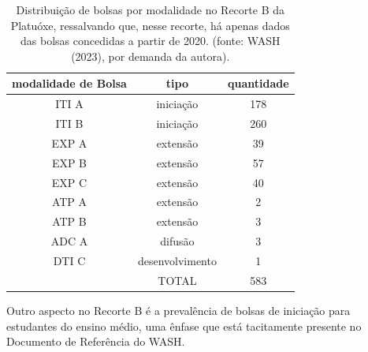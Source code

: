 \noindent\begin{flushright}\mbox{\linespread{1}\selectfont\centering{}}\end{flushright}






\begin{table}[htb]
\tiny
\caption{\label{8869e5a84c342de33f5dd045c633ba43f41c955f}Distribuição de bolsas por modalidade no Recorte B da Platuóxe, ressalvando que, nesse recorte, há apenas dados das bolsas concedidas a partir de 2020. (fonte:  WASH (2023), por demanda da autora).}

\centering
\begin{tabular}{|c|c|c|}
\hline
modalidade de Bolsa  &  tipo  &  quantidade \\
\hline
ITI A  &  iniciação  &  178 \\
ITI B  &  iniciação  &  260 \\
EXP A  &  extensão  &  39 \\
EXP B  &  extensão  &  57 \\
EXP C  &  extensão  &  40 \\
ATP A  &  extensão  &  2 \\
ATP B  &  extensão  &  3 \\
ADC A  &  difusão  &  3 \\
DTI C  &  desenvolvimento  &  1 \\
\hline
  &  TOTAL  &  583 \\
\hline
\end{tabular}
\end{table}


Outro aspecto no Recorte B é a prevalência de bolsas de iniciação para estudantes do ensino médio, uma ênfase que está tacitamente presente no Documento de Referência do WASH.


\noindent\begin{flushright}\mbox{\linespread{1}\selectfont\centering{}}\end{flushright}


